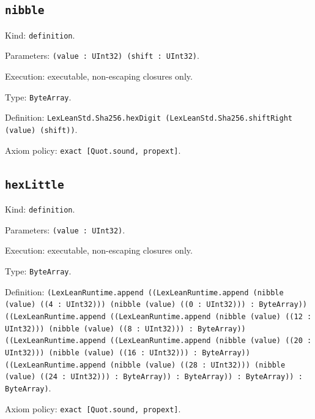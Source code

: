 \documentclass[11pt]{article}
\begin{document}
\subsection*{\texttt{nibble}}
\noindent Kind: \texttt{definition}.\par
\noindent Parameters: \texttt{(value : UInt32) (shift : UInt32)}.\par
\noindent Execution: executable, non-escaping closures only.\par
\noindent Type: \texttt{ByteArray}.\par
\noindent Definition: \texttt{LexLeanStd.Sha256.hexDigit (LexLeanStd.Sha256.shiftRight (value) (shift))}.\par
\noindent Axiom policy: \texttt{exact [Quot.sound, propext]}.\par
\subsection*{\texttt{hexLittle}}
\noindent Kind: \texttt{definition}.\par
\noindent Parameters: \texttt{(value : UInt32)}.\par
\noindent Execution: executable, non-escaping closures only.\par
\noindent Type: \texttt{ByteArray}.\par
\noindent Definition: \texttt{(LexLeanRuntime.append ((LexLeanRuntime.append (nibble (value) ((4 : UInt32))) (nibble (value) ((0 : UInt32))) : ByteArray)) ((LexLeanRuntime.append ((LexLeanRuntime.append (nibble (value) ((12 : UInt32))) (nibble (value) ((8 : UInt32))) : ByteArray)) ((LexLeanRuntime.append ((LexLeanRuntime.append (nibble (value) ((20 : UInt32))) (nibble (value) ((16 : UInt32))) : ByteArray)) ((LexLeanRuntime.append (nibble (value) ((28 : UInt32))) (nibble (value) ((24 : UInt32))) : ByteArray)) : ByteArray)) : ByteArray)) : ByteArray)}.\par
\noindent Axiom policy: \texttt{exact [Quot.sound, propext]}.\par
\end{document}
